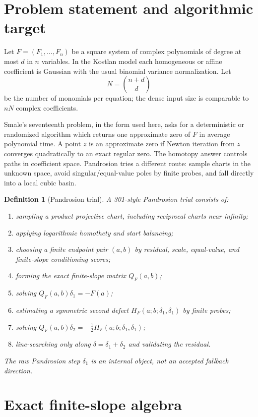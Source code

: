 \documentclass[11pt]{article}
\newtheorem{definition}{Definition}[section]
\begin{document}
\section{Problem statement and algorithmic target}

Let $F=(F_1,\ldots,F_n)$ be a square system of complex polynomials of degree at most $d$ in $n$ variables.  In the Kostlan model each homogeneous or affine coefficient is Gaussian with the usual binomial variance normalization.  Let
\[
        N=\binom{n+d}{d}
\]
be the number of monomials per equation; the dense input size is comparable to $nN$ complex coefficients.

Smale's seventeenth problem, in the form used here, asks for a deterministic or randomized algorithm which returns one approximate zero of $F$ in average polynomial time.  A point $z$ is an approximate zero if Newton iteration from $z$ converges quadratically to an exact regular zero.  The homotopy answer controls paths in coefficient space.  Pandrosion tries a different route: sample charts in the unknown space, avoid singular/equal-value poles by finite probes, and fall directly into a local cubic basin.

\begin{definition}[Pandrosion trial]
A 301-style Pandrosion trial consists of:
\begin{enumerate}[label=(\roman*)]
\item sampling a product projective chart, including reciprocal charts near infinity;
\item applying logarithmic homothety and start balancing;
\item choosing a finite endpoint pair $(a,b)$ by residual, scale, equal-value, and finite-slope conditioning scores;
\item forming the exact finite-slope matrix $Q_F(a,b)$;
\item solving $Q_F(a,b)\delta_1=-F(a)$;
\item estimating a symmetric second defect $H_F(a;b;\delta_1,\delta_1)$ by finite probes;
\item solving $Q_F(a,b)\delta_2=-\frac12H_F(a;b;\delta_1,\delta_1)$;
\item line-searching only along $\delta=\delta_1+\delta_2$ and validating the residual.
\end{enumerate}
The raw Pandrosion step $\delta_1$ is an internal object, not an accepted fallback direction.
\end{definition}

\section{Exact finite-slope algebra}
\end{document}
